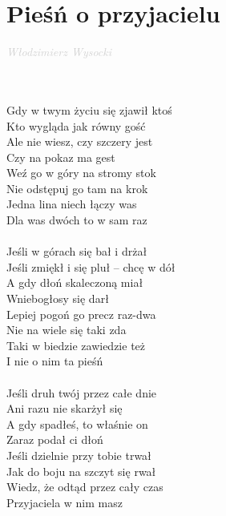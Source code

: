\documentclass[a5paper, 10pt]{book}
\begin{document}
\section{Pieśń o przyjacielu}\textcolor{lightgray}{\textit{Włodzimierz Wysocki}}\\~\\
\begin{minipage}[t]{0.5\textwidth}
~\\
Gdy w twym życiu się zjawił ktoś\\
Kto wygląda jak równy gość\\
Ale nie wiesz, czy szczery jest\\
Czy na pokaz ma gest\\
\hspace*{5mm}Weź go w góry na stromy stok\\
\hspace*{5mm}Nie odstępuj go tam na krok\\
\hspace*{5mm}Jedna lina niech łączy was\\
\hspace*{5mm}Dla was dwóch to w sam raz\\
\\
Jeśli w górach się bał i drżał\\
Jeśli zmiękł i się pluł – chcę w dół\\
A gdy dłoń skaleczoną miał\\
Wniebogłosy się darł\\
\hspace*{5mm}Lepiej pogoń go precz raz-dwa\\
\hspace*{5mm}Nie na wiele się taki zda\\
\hspace*{5mm}Taki w biedzie zawiedzie też\\
\hspace*{5mm}I nie o nim ta pieśń\\
\\
Jeśli druh twój przez całe dnie\\
Ani razu nie skarżył się\\
A gdy spadłeś, to właśnie on\\
Zaraz podał ci dłoń\\
\hspace*{5mm}Jeśli dzielnie przy tobie trwał\\
\hspace*{5mm}Jak do boju na szczyt się rwał\\
\hspace*{5mm}Wiedz, że odtąd przez cały czas\\
\hspace*{5mm}Przyjaciela w nim masz\\
\end{minipage}
\end{document}
